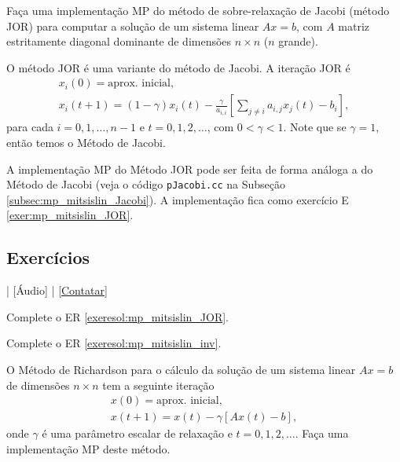 \begin{exeresol}\label{exeresol:mp_mitsislin_JOR}
  Faça uma implementação MP do método de sobre-relaxação de Jacobi (método JOR) para computar a solução de um sistema linear $Ax = b$, com $A$ matriz estritamente diagonal dominante de dimensões $n\times n$ ($n$ grande).
\end{exeresol}
\begin{resol}
  O método JOR é uma variante do método de Jacobi. A iteração JOR é
  \begin{gather}
    x_i(0) = \text{aprox. inicial},\\
    x_i(t+1) = (1-\gamma)x_i(t) -\frac{\gamma}{a_{i,i}}\left[\sum_{j\neq i}a_{i,j}x_j(t) - b_i\right],
  \end{gather}
  para cada $i=0,1,\dotsc,n-1$ e $t=0,1,2,\ldots$, com $0<\gamma<1$. Note que se $\gamma=1$, então temos o Método de Jacobi.

  A implementação MP do Método JOR pode ser feita de forma análoga a do Método de Jacobi (veja o código \verb+pJacobi.cc+ na Subseção \ref{subsec:mp_mitsislin_Jacobi}). A implementação fica como exercício E \ref{exer:mp_mitsislin_JOR}.
\end{resol}

\subsection*{Exercícios}

\begin{flushright}
  [Vídeo] | [Áudio] | \href{https://phkonzen.github.io/notas/contato.html}{[Contatar]}
\end{flushright}

\begin{exer}\label{exer:mp_mitsislin_JOR}
  Complete o ER \ref{exeresol:mp_mitsislin_JOR}.
\end{exer}

\begin{exer}\label{exer:mp_mitsislin_inv}
  Complete o ER \ref{exeresol:mp_mitsislin_inv}.
\end{exer}

\begin{exer}
  O Método de Richardson para o cálculo da solução de um sistema linear $Ax = b$ de dimensões $n\times n$ tem a seguinte iteração
  \begin{gather}
    x(0) = \text{aprox. inicial},\\
    x(t+1) = x(t) - \gamma\left[Ax(t) - b\right],
  \end{gather}
  onde $\gamma$ é uma parâmetro escalar de relaxação e $t=0,1,2,\ldots$. Faça uma implementação MP deste método.
\end{exer}

